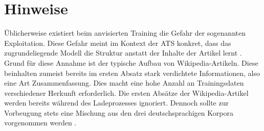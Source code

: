 \section{Hinweise}
\noindent
Üblicherweise existiert beim anvisierten Training die Gefahr der sogenannten Exploitation. Diese Gefahr meint im Kontext der \ac{ATS} konkret, dass das zugrundeliegende Modell die Struktur anstatt der Inhalte der Artikel lernt \cite[S.~476]{GOO16}. Grund für diese Annahme ist der typische Aufbau von Wikipedia-Artikeln. Diese beinhalten zumeist bereits im ersten Absatz stark verdichtete Informationen, also eine Art Zusammenfassung. Dies macht eine hohe Anzahl an Trainingsdaten verschiedener Herkunft erforderlich. Die ersten Absätze der Wikipedia-Artikel werden bereits während des Ladeprozesses ignoriert. Dennoch sollte zur Vorbeugung stets eine Mischung aus den drei deutschsprachigen Korpora vorgenommen werden \cite[S.~42]{BIR09}.
